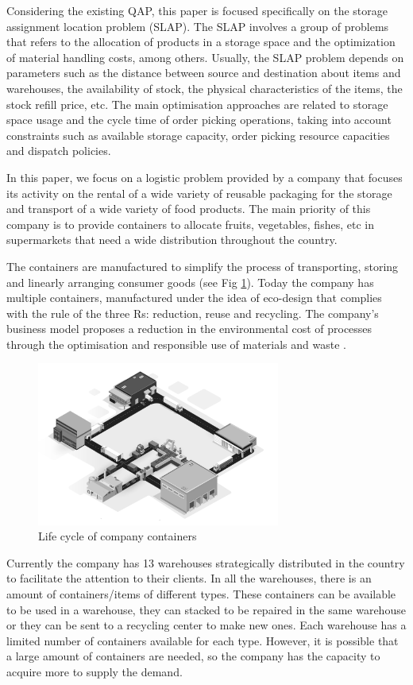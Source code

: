 \documentclass[letterpaper]{article} %
\begin{document}
Considering the existing QAP, this paper is focused specifically on the storage assignment location problem (SLAP). The SLAP involves a group of problems that refers to the allocation of products in a storage space and the optimization of material handling costs, among others. Usually, the SLAP problem depends on  parameters such as the distance between source and destination about items and warehouses, the availability of stock, the physical characteristics of the items, the stock refill price, etc. The main optimisation approaches are related to storage space usage and the cycle time of order picking operations, taking into account constraints such as available storage capacity, order picking resource capacities and dispatch policies. \cite{Syed-abdullah2018}


In this paper, we focus on a logistic problem provided by a company that focuses its activity on the rental of a wide variety of reusable packaging for the storage and transport of a wide variety of food products. The main priority of this company is to provide containers to allocate fruits, vegetables, fishes, etc in supermarkets that need a wide distribution throughout the country.

The containers are manufactured to simplify the process of transporting, storing and linearly arranging consumer goods (see Fig \ref{fig:covers}). Today the company has multiple containers, manufactured under the idea of eco-design that complies with the rule of the three Rs: reduction, reuse and recycling. The company's business model proposes a reduction in the environmental cost of processes through the optimisation and responsible use of materials and waste .

\begin{figure}[H]
    \includegraphics[width=8cm]{img/map.png}
    \centering
    \caption{Life cycle of company containers}
    \label{fig:covers}
\end{figure}

Currently the company has 13 warehouses strategically distributed in the country to facilitate the attention to their clients. In all the warehouses, there is an amount of containers/items of different types. These containers can be available to be used in a warehouse, they can stacked to be repaired in the same warehouse or they can be sent to a recycling center to make new ones. Each warehouse has a limited number of containers available for each type. However, it is possible that a large amount of containers are needed, so the company has the capacity to acquire more to supply the demand.
\end{document}
